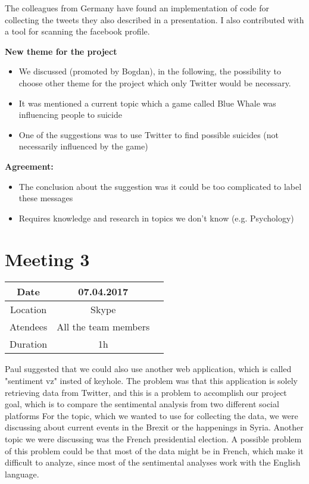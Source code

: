 The colleagues from Germany have found an implementation of code for collecting the tweets they also  described
in a presentation. I also contributed with a tool for scanning the facebook profile.

\textbf{New theme for the project}
\begin{itemize}
	\item We discussed (promoted by Bogdan), in the following,
	the possibility to choose other theme for the project which
	only Twitter would be necessary.
	\item 	It was mentioned a current topic which a game called
	Blue Whale was influencing people to suicide
	\item One of the suggestions was to use Twitter to find
	possible suicides (not necessarily influenced by the game)
\end{itemize}
\textbf{Agreement:}
\begin{itemize}
	\item The conclusion about the suggestion was it could be too
	complicated to label these messages
	\item Requires knowledge and research in topics we don't
	know (e.g. Psychology)
\end{itemize}


\section{Meeting 3}
\begin{center}
	\begin{tabular}{| c | c | c }
		\hline
		Date & 	07.04.2017   \\
		\hline
		Location & Skype  \\
		\hline
		Atendees & All the team members   \\
		\hline
		Duration & 1h  \\
		\hline
	\end{tabular}
\end{center}
Paul suggested that we could also use another web application, which is called "sentiment vz" insted of keyhole.
The problem was that this application is solely
retrieving data from Twitter, and this is a problem to
accomplish our project goal, which is to compare the
sentimental analysis from two different social
platforms
For the topic, which we wanted to use for collecting the
data, we were discussing about current events in the Brexit or the happenings in Syria.
Another topic we were discussing was the French
presidential election. A possible problem of this
problem could be that most of the data might be in
French, which make it difficult to analyze, since most of
the sentimental analyses work with the English
language.

